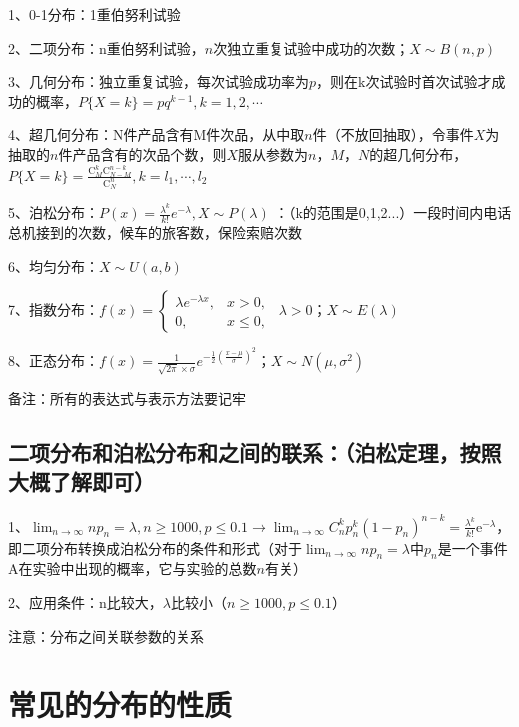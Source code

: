 1、0-1分布：1重伯努利试验

2、二项分布：n重伯努利试验，$n$次独立重复试验中成功的次数；$X \sim B(n,p)$

3、几何分布：独立重复试验，每次试验成功率为$p$，则在k次试验时首次试验才成功的概率，$P\{X=k\}=p q^{k-1}, k=1,2, \cdots$

4、超几何分布：N件产品含有M件次品，从中取$n$件（不放回抽取），令事件$X$为抽取的$n$件产品含有的次品个数，则$X$服从参数为$n$，$M$，$N$的超几何分布，$P\{X=k\}=\frac{\mathrm{C}_{M}^{k} \mathrm{C}_{N-M}^{n-k}}{\mathrm{C}_{N}^{n}}, k=l_{1}, \cdots, l_{2}$

5、泊松分布：$P(x) = \frac{\lambda^k}{k!}e^{-\lambda},X \sim P(\lambda)$ ：（k的范围是0,1,2...）一段时间内电话总机接到的次数，候车的旅客数，保险索赔次数

6、均匀分布：$X \sim U(a,b)$

7、指数分布：$f(x) = \begin{cases} \lambda e^{-\lambda x}, & x > 0, \\[5ex] 0, & x \le 0, \end{cases} \ \ \lambda >0$；$X \sim E(\lambda)$

8、正态分布：$f(x)=\frac{1}{\sqrt{{2\pi}}\times\sigma}e^{-\frac{1}{2}(\frac{x-\mu}{\sigma})^2}$；$X \sim N(\mu,\sigma^2)$



备注：所有的表达式与表示方法要记牢



\subsection{二项分布和泊松分布和之间的联系：（泊松定理，按照大概了解即可）}

1、$\lim_{n \rightarrow \infty}np_n=\lambda, n\ge1000,p\le0.1 \rightarrow \lim _{n \rightarrow \infty} C_{n}^{k} p_{n}^{k}\left(1-p_{n}\right)^{n-k}=\frac{\lambda^{k}}{k !} \mathrm{e}^{-\lambda}$，即二项分布转换成泊松分布的条件和形式（对于$\lim_{n \rightarrow \infty}np_n=\lambda$中$p_n$是一个事件A在实验中出现的概率，它与实验的总数$n$有关）

2、应用条件：n比较大，$\lambda$比较小（$n\ge1000,p\le0.1$）

注意：分布之间关联参数的关系



\section{常见的分布的性质}



